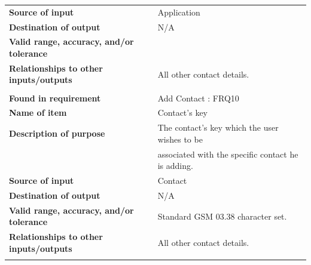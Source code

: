 \begin{tabular}{ll}
\textbf{Source of input}&Application\\
\textbf{Destination of output}&N/A\\
\textbf{Valid range, accuracy, and/or tolerance}&\\
\textbf{Relationships to other inputs/outputs}&All other contact details.\\
&\\
\textbf{Found in requirement}&Add Contact : FRQ10\\
\textbf{Name of item}&Contact's key\\
\textbf{Description of purpose}&The contact's key which the user wishes to be\\& associated with the specific contact he is adding.\\
\textbf{Source of input}&Contact\\
\textbf{Destination of output}&N/A\\
\textbf{Valid range, accuracy, and/or tolerance}&Standard GSM 03.38 character set.\\
\textbf{Relationships to other inputs/outputs}&All other contact details.\\
&\\
\end{tabular}
\newpage
